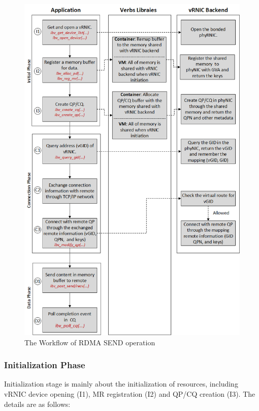 \begin{figure}[!ht]
	\centering
	\includegraphics[width=1\linewidth]{images/RDMA-path.png}
	\caption{The Workflow of RDMA SEND operation}
	\label{fig:rdma-path}
\end{figure}

\subsubsection{Initialization Phase}
Initialization stage is mainly about the initialization of resources, including vRNIC device opening (I1), MR registration (I2) and QP/CQ creation (I3). The details are as follows:

